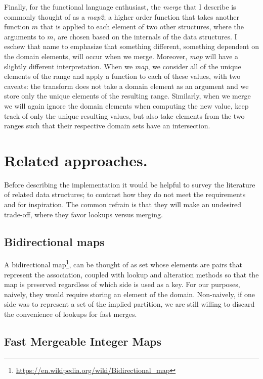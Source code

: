 \documentclass{article}
\begin{document}
Finally, for the functional language enthusiast, the \emph{merge} that I
describe is commonly thought of as a \emph{map2}; a higher order function that
takes another function $m$ that is applied to each element of two other
structures,
where the arguments to $m$,
are chosen based on the internals of the data structures.
I eschew that name to emphasize that something different,
something dependent on the domain elements,
will occur when we merge.
Moreover, \emph{map} will have a slightly different interpretation.
When we \emph{map},
we consider all of the unique elements of the range and
apply a function to each of these values,
with two caveats: the transform does not take a domain element as an
argument and we store only the unique elements of the resulting range.
Similarly, when we merge we will again ignore the domain elements when computing
the new value,
keep track of only the unique resulting values,
but also take elements from the two ranges such that their respective domain sets
have an intersection.


\section{Related approaches.}

Before describing the implementation it would be helpful to survey the
literature of related data structures;
to contrast how they do not meet the requirements and
for inspiration.
The common refrain is that they will make an undesired trade-off,
where they favor lookups versus merging.

\subsection{Bidirectional maps}

A bidirectional map\footnote{\url{https://en.wikipedia.org/wiki/Bidirectional_map}},
can be thought of as set whose elements are pairs that represent the association,
coupled with lookup and alteration methods so that the map is preserved regardless
of which side is used as a key.
For our purposes, naively, they would require storing an element of the domain.
Non-naively, if one side was to represent a set of the implied partition,
we are still willing to discard the convenience of lookups for fast merges.

\subsection{Fast Mergeable Integer Maps}
\end{document}
